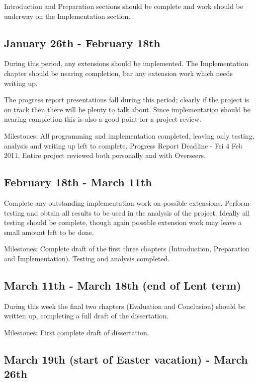 Introduction and Preparation sections should be complete and work should be underway on the Implementation section.

\subsection*{January 26th - February 18th }

During this period, any extensions should be implemented. The Implementation chapter should be nearing completion, bar any extension work which needs writing up.

The progress report presentations fall during this period; clearly if the project is on track then there will be plenty to talk about. Since implementation should be nearing completion this is also a good point for a project review.

Milestones: All programming and implementation completed, leaving only testing, analysis and writing up left to complete. Progress Report Deadline - Fri 4 Feb 2011. Entire project reviewed both personally and with Overseers.


\subsection*{February 18th - March 11th}

Complete any outstanding implementation work on possible extensions. Perform testing and obtain all results to be used in the analysis of the project. Ideally all testing should be complete, though again possible extension work may leave a small amount left to be done.

Milestones: Complete draft of the first three chapters (Introduction, Preparation and Implementation). Testing and analysis completed.

\subsection*{March 11th - March 18th (end of Lent term)}

During this week the final two chapters (Evaluation and Conclusion) should be written up, completing a full draft of the dissertation.

Milestones: First complete draft of dissertation.

\subsection*{March 19th (start of Easter vacation) - March 26th }

